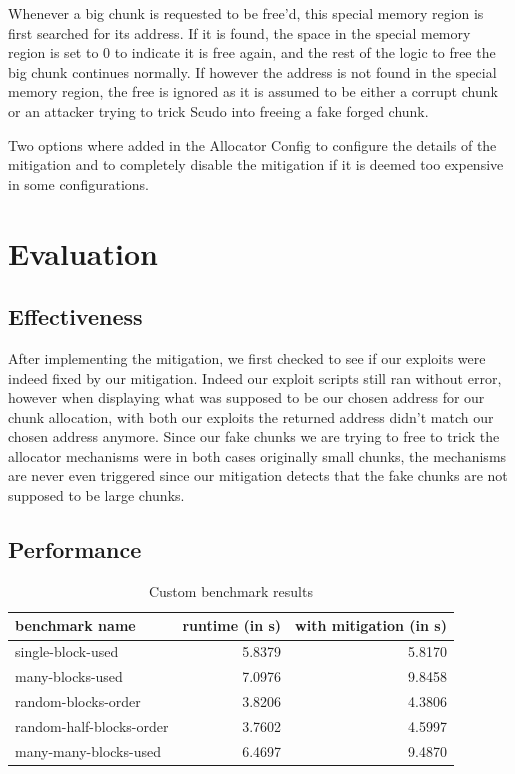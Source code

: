 \documentclass[a4paper,11pt,oneside]{report}
\begin{document}
Whenever a big chunk is requested to be free'd, this special memory region is first
searched for its address. If it is found, the space in the special memory region is set to
0 to indicate it is free again, and the rest of the logic to free the big chunk continues
normally. If however the address is not found in the special memory region, the free is
ignored as it is assumed to be either a corrupt chunk or an attacker trying to trick Scudo
into freeing a fake forged chunk.

Two options where added in the Allocator Config to configure the details of the mitigation
and to completely disable the mitigation if it is deemed too expensive in some
configurations.

\section{Evaluation}

\subsection{Effectiveness}

After implementing the mitigation, we first checked to see if our exploits were indeed
fixed by our mitigation. Indeed our exploit scripts still ran without error, however when
displaying what was supposed to be our chosen address for our chunk allocation, with both
our exploits the returned address didn't match our chosen address anymore. Since our fake
chunks we are trying to free to trick the allocator mechanisms were in both cases
originally small chunks, the mechanisms are never even triggered since our mitigation
detects that the fake chunks are not supposed to be large chunks.

\subsection{Performance}

\begin{longtable}[h]{l r r}
  \caption{Custom benchmark results}\label{tab:CustomBenchmark} \\
  
  \toprule
  benchmark name           & runtime (in s) & with mitigation (in s) \\
  \midrule
  \endhead{}
  single-block-used        & 5.8379         & 5.8170                 \\
  \midrule
  many-blocks-used         & 7.0976         & 9.8458                 \\
  \midrule
  random-blocks-order      & 3.8206         & 4.3806                 \\
  \midrule
  random-half-blocks-order & 3.7602         & 4.5997                 \\
  \midrule
  many-many-blocks-used    & 6.4697         & 9.4870                 \\
  \bottomrule
\end{longtable}
\end{document}
